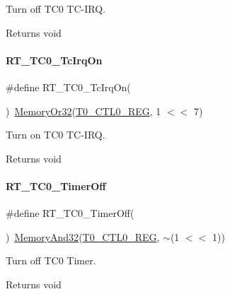 Turn off T\+C0 T\+C-\/\+I\+RQ. 

\begin{DoxyReturn}{Returns}
void 
\end{DoxyReturn}
\mbox{\label{a00077_a1ff15e860147b3fff582b7603ba7ffa8}} 
\paragraph{\texorpdfstring{R\+T\+\_\+\+T\+C0\+\_\+\+Tc\+Irq\+On}{RT\_TC0\_TcIrqOn}}
{\footnotesize\ttfamily \#define R\+T\+\_\+\+T\+C0\+\_\+\+Tc\+Irq\+On(\begin{DoxyParamCaption}{ }\end{DoxyParamCaption})~\mbox{\hyperlink{a00026_a27874a97deab7cecdde5ddecf466e31e}{Memory\+Or32}}(\mbox{\hyperlink{a00026_ac94b0659ef32086a6752672082c0b3ed}{T0\+\_\+\+C\+T\+L0\+\_\+\+R\+EG}}, 1 $<$$<$ 7)}



Turn on T\+C0 T\+C-\/\+I\+RQ. 

\begin{DoxyReturn}{Returns}
void 
\end{DoxyReturn}
\mbox{\label{a00077_acbfad29faf802168f3281e5754e40aa9}} 
\paragraph{\texorpdfstring{R\+T\+\_\+\+T\+C0\+\_\+\+Timer\+Off}{RT\_TC0\_TimerOff}}
{\footnotesize\ttfamily \#define R\+T\+\_\+\+T\+C0\+\_\+\+Timer\+Off(\begin{DoxyParamCaption}{ }\end{DoxyParamCaption})~\mbox{\hyperlink{a00026_ad87cedffcaadc51db22594fce55173d4}{Memory\+And32}}(\mbox{\hyperlink{a00026_ac94b0659ef32086a6752672082c0b3ed}{T0\+\_\+\+C\+T\+L0\+\_\+\+R\+EG}}, $\sim$(1 $<$$<$ 1))}



Turn off T\+C0 Timer. 

\begin{DoxyReturn}{Returns}
void 
\end{DoxyReturn}
\mbox{\label{a00077_aa7936fffa8b7bcd47751d2e89f81d4a9}} 
